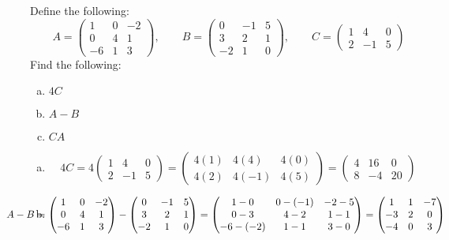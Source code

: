 \documentclass[12pt,letterpaper]{exam}
\begin{document}
\begin{questions}
\newpage
\question[10] Define the following:
	\[
	A= 
	\begin{pmatrix}
	1 & 0 & -2 \\
	0 & 4 & 1 \\
	-6 & 1 & 3
	\end{pmatrix},
	\qquad
	B= 
	\begin{pmatrix}
	0 & -1 & 5 \\
	3 & 2 & 1 \\
	-2 & 1 & 0 
	\end{pmatrix},
	\qquad
	C= 
	\begin{pmatrix}
	1 & 4 & 0 \\
	2 & -1 & 5 
	\end{pmatrix}
	\]
Find the following:
	\begin{enumerate}[(a)]
	\item $4C$
	\item $A - B$
	\item $CA$
	\end{enumerate} \pspace

\sol 
\begin{enumerate}[(a)]
\item 
	\[
	4C=
	4 
	\begin{pmatrix}
	1 & 4 & 0 \\
	2 & -1 & 5 
	\end{pmatrix}= 
	\begin{pmatrix}
	4(1) & 4(4) & 4(0) \\
	4(2) & 4(-1) & 4(5) 
	\end{pmatrix}=
	\begin{pmatrix}
	4 & 16 & 0 \\
	8 & -4 & 20 
	\end{pmatrix}
	\] \pspace

\item 
	\[
	\hspace{-1.5cm} A - B= 
	\begin{pmatrix}
	1 & 0 & -2 \\
	0 & 4 & 1 \\
	-6 & 1 & 3
	\end{pmatrix} - 	
	\begin{pmatrix}
	0 & -1 & 5 \\
	3 & 2 & 1 \\
	-2 & 1 & 0 
	\end{pmatrix}= 
	\begin{pmatrix}
	1 - 0 & 0 - (-1) & -2 - 5 \\
	0 - 3 & 4 - 2 & 1 - 1 \\
	-6 - (-2) & 1 - 1 & 3 - 0 
	\end{pmatrix}= 
	\begin{pmatrix}
	1 & 1 & -7 \\
	-3 & 2 & 0 \\
	-4 & 0 & 3
	\end{pmatrix} 
	\]


\end{enumerate}
\end{questions}
\end{document}
